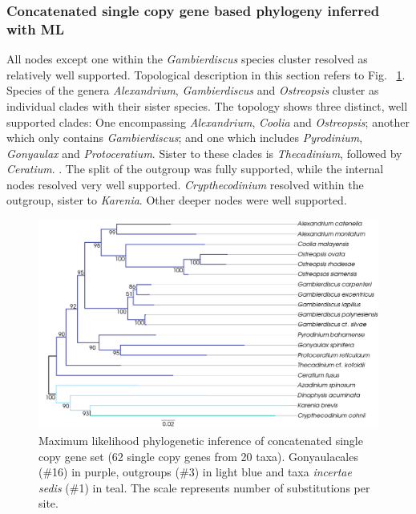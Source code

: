 \documentclass[12pt]{article}
\begin{document}
\subsubsection*{Concatenated single copy gene based phylogeny inferred with ML}
\FloatBarrier
All nodes except one within the \emph{Gambierdiscus} species cluster resolved as relatively well supported. 
Topological description in this section refers to Fig. ~\ref{fig:SCconcatML}. 
Species of the genera \emph{Alexandrium}, \emph{Gambierdiscus} and \emph{Ostreopsis} cluster as individual clades with their sister species.  
The topology shows three distinct, well supported clades: 
One encompassing \emph{Alexandrium}, \emph{Coolia} and \emph{Ostreopsis}; another which only contains \emph{Gambierdiscus}; and one which includes \emph{Pyrodinium}, \emph{Gonyaulax} and \emph{Protoceratium}. 
Sister to these clades is \emph{Thecadinium}, followed by \emph{Ceratium}. .
The split of the outgroup was fully supported, while the internal nodes resolved very well supported. 
\emph{Crypthecodinium} resolved within the outgroup, sister to \emph{Karenia}. 
Other deeper nodes were well supported.
 
\begin{figure} 
\includegraphics[scale=.45]{figures/Singlecopy-concat-ML.png} 
\caption{Maximum likelihood phylogenetic inference of concatenated single copy gene set (62 single copy genes from 20 taxa). Gonyaulacales (\#16) in purple, outgroups (\#3) in light blue and taxa \textit{incertae sedis} (\#1) in teal. The scale represents number of substitutions per site.} 
\label{fig:SCconcatML}
\end{figure} 
\FloatBarrier
\end{document}

